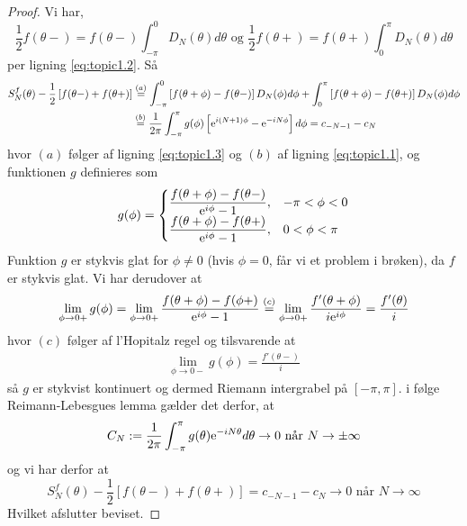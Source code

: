 \begin{proof}
  Vi har,
  \begin{equation*}
    \frac{1}{2} f(\theta-) = f(\theta-) \int_{-\pi}^0 D_{N}(\theta) d \theta \text{ og } \frac{1}{2} f(\theta+) = f(\theta+)\int_0^{\pi} D_{N}(\theta) d \theta
  \end{equation*}
  per ligning \eqref{eq:topic1.2}. Så
  \begin{align*}
    S_{N}^{f}(\theta) - \frac{1}{2}\left[f(\theta-) + f(\theta+)\right] &\stackrel{(a)}= \int_{-\pi}^{0}  \left[f(\theta + \phi) - f(\theta-)\right] D_{N}(\phi) d \phi
    + \int_{0}^{\pi}  \left[f(\theta + \phi) - f(\theta+)\right] D_{N}(\phi) d \phi \\
    &\stackrel{(b)}= \frac{1}{2\pi} \int_{-\pi}^{\pi} g(\phi) \left[\mathrm{e}^{i(N + 1) \phi} - \mathrm{e}^{-i N \phi}\right] d \phi = c_{-N - 1} - c_{N}
  \end{align*}
  hvor $(a)$ følger af ligning \eqref{eq:topic1.3} og $(b)$ af ligning \eqref{eq:topic1.1}, og funktionen $g$ definieres som
  \begin{equation*}
    g(\phi) = \begin{cases}
                    \dfrac{f(\theta + \phi) - f(\theta -)}{\mathrm{e}^{i \phi} - 1}, & -\pi < \phi < 0  \\
                    \dfrac{f(\theta + \phi) - f(\theta +)}{\mathrm{e}^{i \phi} - 1}, & 0 < \phi < \pi
                  \end{cases}
  \end{equation*}
  Funktion $g$ er stykvis glat for $\phi \neq 0$ (hvis $\phi = 0$, får vi et problem i brøken), da $f$ er stykvis glat. Vi har derudover at
  \begin{align*}
    \lim_{\phi \to 0+} g(\phi) = \lim_{\phi \to 0+} \frac{f(\theta + \phi) - f(\phi+)}{\mathrm{e}^{i \phi} - 1} \stackrel{(c)}= \lim_{\phi \to 0+}  \frac{f'(\theta + \phi)}{i \mathrm{e}^{i \phi}} = \frac{f'(\theta)}{i}
  \end{align*}
  hvor $(c)$ følger af l'Hopitalz regel
  og tilsvarende at
  \begin{align*}
    \lim_{\phi \to 0-}  g(\phi) = \frac{f'(\theta-)}{i}
  \end{align*}
  så $g$ er stykvist kontinuert og dermed Riemann intergrabel på $[-\pi, \pi]$. i følge Reimann-Lebesgues lemma gælder det derfor, at
  \begin{equation*}
    C_{N} := \frac{1}{2\pi} \int_{-\pi}^{\pi} g(\theta) \mathrm{e}^{-iN \theta} d \theta \to 0 \text{ når } N \to \pm \infty
  \end{equation*}
  og vi har derfor at
  \begin{equation*}
    S_{N}^{f}(\theta) - \frac{1}{2}\left[f(\theta-) + f(\theta+)\right] = c_{-N - 1} - c_{N} \to 0 \text{ når } N  \to \infty
  \end{equation*}
  Hvilket afslutter beviset.
\end{proof}
